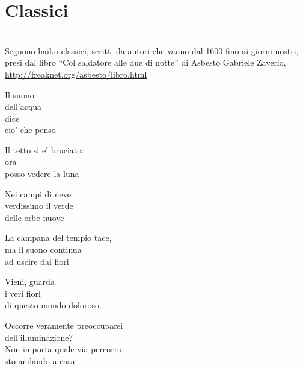 \section{Classici}

\leavevmode\\[0.25in]

Seguono haiku classici, scritti da autori che vanno dal 1600 fino ai giorni nostri, presi dal libro ``Col saldatore alle due di notte'' di Asbesto Gabriele Zaverio,\\
\url{http://freaknet.org/asbesto/libro.html}

\vfill

\begin{haiku}
Il suono\\
dell'acqua\\
dice\\
cio' che penso\\
\end{haiku}

\begin{haiku}
Il tetto si e' bruciato:\\
ora\\
posso vedere la luna\\
\end{haiku}

\begin{haiku}
Nei campi di neve\\
verdissimo il verde\\
delle erbe nuove\\
\end{haiku}

\begin{haiku}
La campana del tempio tace,\\
ma il suono continua\\
ad uscire dai fiori\\
\end{haiku}

\begin{haiku}
Vieni, guarda\\
i veri fiori\\
di questo mondo doloroso.\\
\end{haiku}

\begin{haiku}
Occorre veramente preoccuparsi\\
dell'illuminazione?\\
Non importa quale via percorro,\\
sto andando a casa.\\
\end{haiku}

